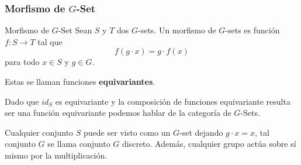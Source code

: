 \begin{frame}
    \frametitle{Morfismo de $G$-Set}
    
    \begin{block}{Morfismo de $G$-Set}
        Sean $S$ y $T$ dos $G$-sets. Un morfismo de $G$-sets es función
        $f : S \to T$ tal que
        $$ f (g \cdot  x) = g \cdot f(x)$$
        para todo $x\in S$ y $g \in G$.
    \end{block}

    Estas se llaman funciones \textbf{equivariantes}.
    
    Dado que $id_{S}$ es equivariante y la composición de funciones equivariante
    resulta ser una función equivariante podemos hablar de la categoría de $G$-Sets.
    
    Cualquier conjunto $S$ puede ser visto como un $G$-set dejando $g \cdot x = x$,
    tal conjunto $G$ se llama conjunto $G$ discreto. Además, cualquier grupo actúa
    sobre sí mismo por la multiplicación.    	
\end{frame}